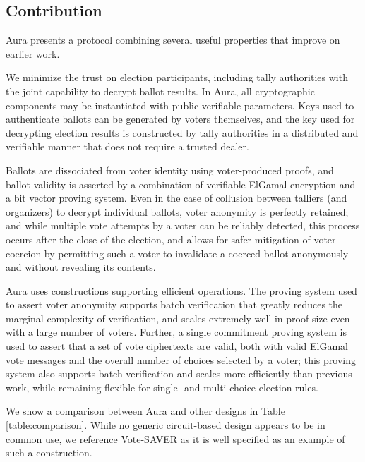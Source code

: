 \documentclass{llncs}
\begin{document}
\subsection{Contribution}

Aura presents a protocol combining several useful properties that improve on earlier work.

We minimize the trust on election participants, including tally authorities with the joint capability to decrypt ballot results.
In Aura, all cryptographic components may be instantiated with public verifiable parameters.
Keys used to authenticate ballots can be generated by voters themselves, and the key used for decrypting election results is constructed by tally authorities in a distributed and verifiable manner that does not require a trusted dealer.

Ballots are dissociated from voter identity using voter-produced proofs, and ballot validity is asserted by a combination of verifiable ElGamal encryption and a bit vector proving system.
Even in the case of collusion between talliers (and organizers) to decrypt individual ballots, voter anonymity is perfectly retained; and while multiple vote attempts by a voter can be reliably detected, this process occurs after the close of the election, and allows for safer mitigation of voter coercion by permitting such a voter to invalidate a coerced ballot anonymously and without revealing its contents.

Aura uses constructions supporting efficient operations.
The proving system used to assert voter anonymity supports batch verification that greatly reduces the marginal complexity of verification, and scales extremely well in proof size even with a large number of voters.
Further, a single commitment proving system is used to assert that a set of vote ciphertexts are valid, both with valid ElGamal vote messages and the overall number of choices selected by a voter; this proving system also supports batch verification and scales more efficiently than previous work, while remaining flexible for single- and multi-choice election rules.

We show a comparison between Aura and other designs in Table \ref{table:comparison}.
While no generic circuit-based design appears to be in common use, we reference Vote-SAVER \cite{saver} as it is well specified as an example of such a construction.
\end{document}

